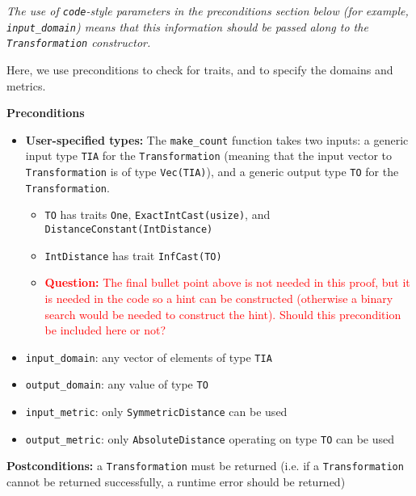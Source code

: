 \documentclass[12pt,letterpaper]{article}
\newcommand{\question}[1]{\textcolor{red}{\textbf{Question:} #1}}
\theoremstyle{definition}
\begin{document}
\emph{The use of \texttt{code}-style parameters in the preconditions section below (for example, \texttt{input\_domain}) means that this information should be passed along to the \texttt{Transformation} constructor.}

Here, we use preconditions to check for traits, and to specify the domains and metrics.

\textbf{Preconditions}
\begin{itemize}
    \item \textbf{User-specified types:} The \texttt{make\_count} function takes two inputs: a generic input type \texttt{TIA} for the \texttt{Transformation} (meaning that the input vector to \texttt{Transformation} is of type \texttt{Vec(TIA)}), and a generic output type \texttt{TO} for the \texttt{Transformation}.
    
    \begin{itemize}
        \item \texttt{TO} has traits \texttt{One}, \texttt{ExactIntCast(usize)}, and \texttt{DistanceConstant(IntDistance)}
        
        \item \texttt{IntDistance} has trait \texttt{InfCast(TO)}
        
        \item \question{The final bullet point above is not needed in this proof, but it is needed in the code so a hint can be constructed (otherwise a binary search would be needed to construct the hint). Should this precondition be included here or not?}
        
    \end{itemize}
    
    \item \texttt{input\_domain}: any vector of elements of type \texttt{TIA}
    
    \item \texttt{output\_domain}: any value of type \texttt{TO}
    
    \item \texttt{input\_metric}: only \texttt{SymmetricDistance} can be used
    
    \item \texttt{output\_metric}: only \texttt{AbsoluteDistance} operating on type \texttt{TO} can be used
\end{itemize}

\textbf{Postconditions:} a \texttt{Transformation} must be returned (i.e. if a \texttt{Transformation} cannot be returned successfully, a runtime error should be returned)
\end{document}
